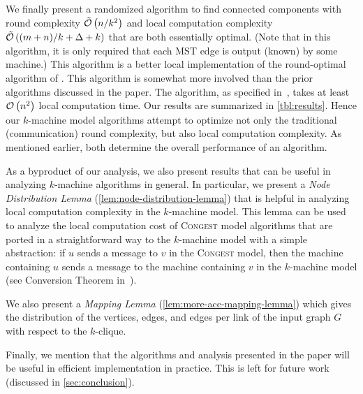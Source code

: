 We finally present a randomized algorithm to find connected components with
round complexity \(\tilde{\mathcal{O}}\left(n/k^2\right)\) and local computation complexity \(\tilde{\mathcal{O}}\left((m+n)/k + \Delta + k\right)\) that are both essentially optimal. (Note that in this algorithm, it is only required that each MST edge is output (known) by some machine.)
This algorithm is a better local implementation of the round-optimal algorithm of \cite{PRS21}.
This algorithm is somewhat more involved than the prior algorithms discussed in the paper.
The algorithm, as specified in~\cite{PRS21}, takes at least
$\mathcal{O}\left(n^2\right)$ local computation time. Our results are summarized in \cref{tbl:results}.
Hence our $k$-machine model algorithms attempt to optimize not only the traditional (communication) round complexity, but also local computation complexity. As mentioned earlier, both determine
the overall performance of an algorithm.


As a byproduct of our analysis, we also present results that
can be useful in analyzing $k$-machine algorithms in general. In particular, we
present a \emph{Node Distribution Lemma} (\cref{lem:node-distribution-lemma})
that is helpful in analyzing local computation complexity in the $k$-machine model.
This lemma can be used to analyze the local computation cost of \textsc{Congest} model
algorithms that are ported in a straightforward way to the $k$-machine model with
a simple  abstraction: if $u$ sends a message to $v$ in the \textsc{Congest} model, then
the machine containing $u$ sends a message to the machine containing $v$ in the
$k$-machine model (see Conversion Theorem in~\cite{KlauckNPR15}).

We also present a \emph{Mapping Lemma} (\cref{lem:more-acc-mapping-lemma})
which gives the distribution of the vertices, edges, and edges per link of the
input graph $G$ with respect to the $k$-clique.

Finally, we mention that the algorithms and analysis presented in the paper will
be useful in efficient implementation in practice. This is left for future work
(discussed in \cref{sec:conclusion}).

